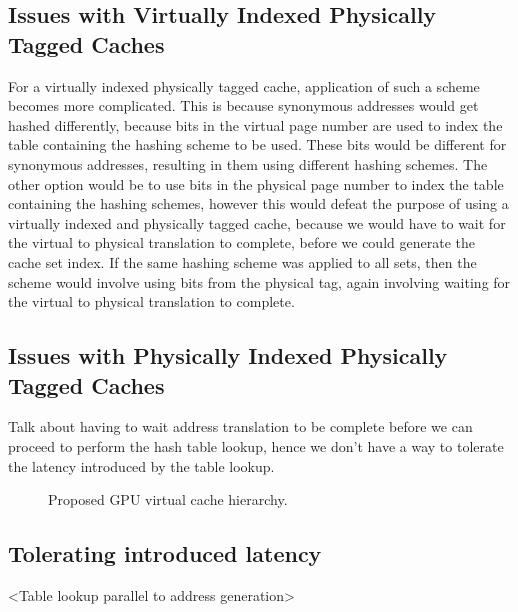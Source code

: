 \subsection{Issues with Virtually Indexed Physically Tagged Caches}
For a virtually indexed physically tagged cache, application of such a scheme becomes more complicated. This is because synonymous addresses would get hashed differently, because bits in the virtual page number are used to index the table containing the hashing scheme to be used. These bits would be different for synonymous addresses, resulting in them using different hashing schemes. The other option would be to use bits in the physical page number to index the table containing the hashing schemes, however this would defeat the purpose of using a virtually indexed and physically tagged cache, because we would have to wait for the virtual to physical translation to complete, before we could generate the cache set index. If the same hashing scheme was applied to all sets, then the scheme would involve using bits from the physical tag, again involving waiting for the virtual to physical translation to complete. 
\subsection{Issues with Physically Indexed Physically Tagged Caches}
Talk about having to wait address translation to be complete before we can 
proceed to perform the hash table lookup, hence we don't have a way to tolerate the latency
introduced by the table lookup. 
\begin{figure}
  \caption{Proposed GPU virtual cache hierarchy.}
  \label{figure:VCDSR_GPU}
\end{figure}
\subsection{Tolerating introduced latency}
<Table lookup parallel to address generation>
